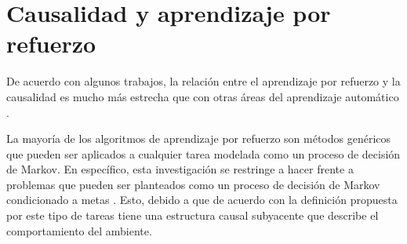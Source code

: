 




\section{Causalidad y aprendizaje por refuerzo}

De acuerdo con algunos trabajos, la relación entre el aprendizaje por refuerzo
y la causalidad es mucho más estrecha que con otras áreas del
aprendizaje automático \cite{schlkopf2019causality} \cite{Gershman2017}. 

La mayoría de los algoritmos de aprendizaje por refuerzo son métodos genéricos que pueden ser aplicados a cualquier tarea modelada como un proceso de decisión de Markov.
En específico, esta investigación se restringe a hacer frente
a problemas que pueden ser planteados como un proceso de decisión de Markov condicionado a metas
\cite{nair2019causal}. Esto, debido a que de acuerdo  con la definición propuesta por \cite{nair2019causal} este 
tipo de tareas tiene una estructura causal subyacente que describe el comportamiento del ambiente.

